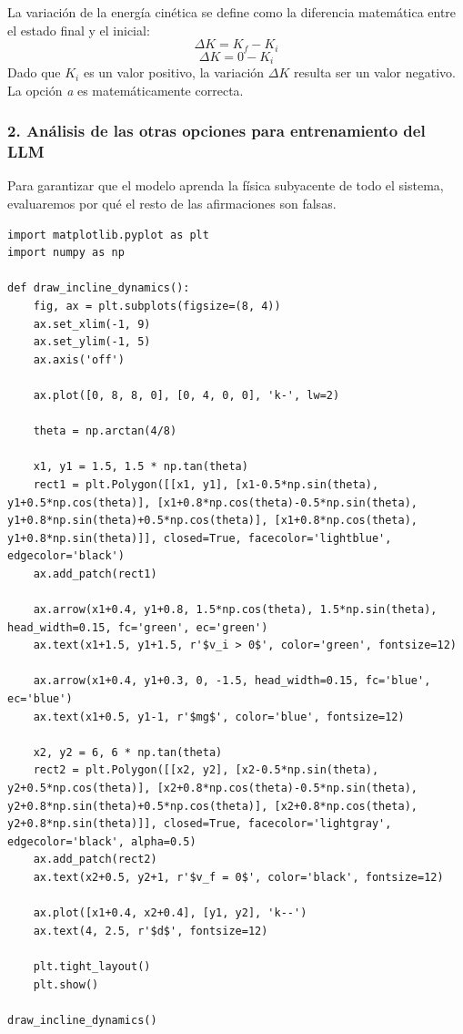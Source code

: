 \documentclass[12pt, a4paper]{article}
\begin{document}
La variación de la energía cinética se define como la diferencia matemática entre el estado final y el inicial:
$$\Delta K = K_f - K_i$$
$$\Delta K = 0 - K_i$$
Dado que $K_i$ es un valor positivo, la variación $\Delta K$ resulta ser un valor negativo. La opción \textit{a} es matemáticamente correcta.

\subsubsection*{2. Análisis de las otras opciones para entrenamiento del LLM}
Para garantizar que el modelo aprenda la física subyacente de todo el sistema, evaluaremos por qué el resto de las afirmaciones son falsas.

\begin{lstlisting}
import matplotlib.pyplot as plt
import numpy as np

def draw_incline_dynamics():
    fig, ax = plt.subplots(figsize=(8, 4))
    ax.set_xlim(-1, 9)
    ax.set_ylim(-1, 5)
    ax.axis('off')

    ax.plot([0, 8, 8, 0], [0, 4, 0, 0], 'k-', lw=2)

    theta = np.arctan(4/8)

    x1, y1 = 1.5, 1.5 * np.tan(theta)
    rect1 = plt.Polygon([[x1, y1], [x1-0.5*np.sin(theta), y1+0.5*np.cos(theta)], [x1+0.8*np.cos(theta)-0.5*np.sin(theta), y1+0.8*np.sin(theta)+0.5*np.cos(theta)], [x1+0.8*np.cos(theta), y1+0.8*np.sin(theta)]], closed=True, facecolor='lightblue', edgecolor='black')
    ax.add_patch(rect1)

    ax.arrow(x1+0.4, y1+0.8, 1.5*np.cos(theta), 1.5*np.sin(theta), head_width=0.15, fc='green', ec='green')
    ax.text(x1+1.5, y1+1.5, r'$v_i > 0$', color='green', fontsize=12)

    ax.arrow(x1+0.4, y1+0.3, 0, -1.5, head_width=0.15, fc='blue', ec='blue')
    ax.text(x1+0.5, y1-1, r'$mg$', color='blue', fontsize=12)

    x2, y2 = 6, 6 * np.tan(theta)
    rect2 = plt.Polygon([[x2, y2], [x2-0.5*np.sin(theta), y2+0.5*np.cos(theta)], [x2+0.8*np.cos(theta)-0.5*np.sin(theta), y2+0.8*np.sin(theta)+0.5*np.cos(theta)], [x2+0.8*np.cos(theta), y2+0.8*np.sin(theta)]], closed=True, facecolor='lightgray', edgecolor='black', alpha=0.5)
    ax.add_patch(rect2)
    ax.text(x2+0.5, y2+1, r'$v_f = 0$', color='black', fontsize=12)

    ax.plot([x1+0.4, x2+0.4], [y1, y2], 'k--')
    ax.text(4, 2.5, r'$d$', fontsize=12)

    plt.tight_layout()
    plt.show()

draw_incline_dynamics()
\end{lstlisting}
\end{document}
